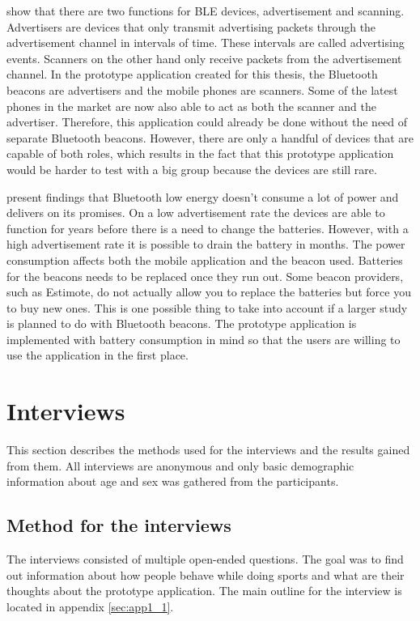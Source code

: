 \cite{bluetoothOverview} show that there are two functions for BLE devices, advertisement and scanning. Advertisers are devices that only transmit advertising packets through the advertisement channel in intervals of time. These intervals are called advertising events. Scanners on the other hand only receive packets from the advertisement channel. In the prototype application created for this thesis, the Bluetooth beacons are advertisers and the mobile phones are scanners. Some of the latest phones in the market are now also able to act as both the scanner and the advertiser. Therefore, this application could already be done without the need of separate Bluetooth beacons. However, there are only a handful of devices that are capable of both roles, which results in the fact that this prototype application would be harder to test with a big group because the devices are still rare.

\cite{bluetoothOverview} present findings that Bluetooth low energy doesn't consume a lot of power and delivers on its promises. On a low advertisement rate the devices are able to function for years before there is a need to change the batteries. However, with a high advertisement rate it is possible to drain the battery in months. The power consumption affects both the mobile application and the beacon used. Batteries for the beacons needs to be replaced once they run out. Some beacon providers, such as Estimote, do not actually allow you to replace the batteries but force you to buy new ones. This is one possible thing to take into account if a larger study is planned to do with Bluetooth beacons. The prototype application is implemented with battery consumption in mind so that the users are willing to use the application in the first place.

\section{Interviews}

This section describes the methods used for the interviews and the results gained from them. All interviews are anonymous and only basic demographic information about age and sex was gathered from the participants.

\subsection{Method for the interviews}

The interviews consisted of multiple open-ended questions. The goal was to find out information about how people behave while doing sports and what are their thoughts about the prototype application. The main outline for the interview is located in appendix \ref{sec:app1_1}.

